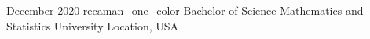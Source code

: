 
\Education
{December 2020}
{recaman_one_color}
{Bachelor of Science}
{Mathematics and Statistics}
{University}
{Location, USA}